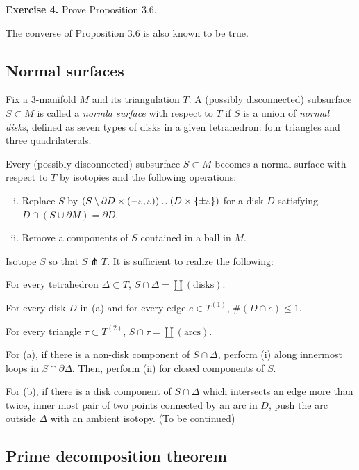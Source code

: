 \documentclass{../../small}
\begin{document}
\noindent\textbf{Exercise 4.} Prove Proposition 3.6.
\begin{rmk}
The converse of Proposition 3.6 is also known to be true.
\end{rmk}

\subsection{Normal surfaces}

Fix a 3-manifold $M$ and its triangulation $T$.
A (possibly disconnected) subsurface $S\subset M$ is called a \emph{normla surface} with respect to $T$ if $S$ is a union of \emph{normal disks}, defined as seven types of disks in a given tetrahedron: four triangles and three quadrilaterals.

\begin{prop}
Every (possibly disconnected) subsurface $S\subset M$ becomes a normal surface with respect to $T$ by isotopies and the following operations:
\begin{enumerate}[(i)]
\item Replace $S$ by $(S\setminus\partial D\times(-\varepsilon,\varepsilon))\cup(D\times\{\pm\varepsilon\})$ for a disk $D$ satisfying $D\cap(S\cup\partial M)=\partial D$.
\item Remove a components of $S$ contained in a ball in $M$.
\end{enumerate}
\end{prop}
\begin{pf}
Isotope $S$ so that $S\pitchfork T$.
It is sufficient to realize the following:
\begin{parts}
\item For every tetrahedron $\Delta\subset T$, $S\cap\Delta=\coprod(\text{disks})$.
\item For every disk $D$ in (a) and for every edge $e\in T^{(1)}$, $\#(D\cap e)\le1$.
\item For every triangle $\tau\subset T^{(2)}$, $S\cap\tau=\coprod(\text{arcs})$.
\end{parts}

For (a), if there is a non-disk component of $S\cap\Delta$, perform (i) along innermost loops in $S\cap\partial\Delta$.
Then, perform (ii) for closed components of $S$.

For (b), if there is a disk component of $S\cap\Delta$ which intersects an edge more than twice, inner most pair of two points connected by an arc in $D$, push the arc outside $\Delta$ with an ambient isotopy.
(To be continued)
\end{pf}


\subsection{Prime decomposition theorem}
\end{document}
